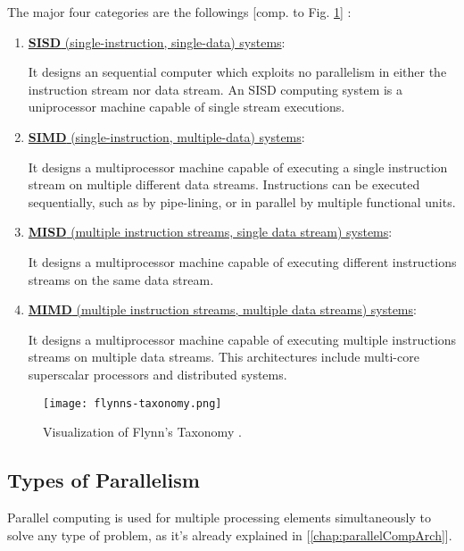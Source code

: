 \noindent The major four categories are the followings [comp. to Fig. \ref{fig:flynnsTax}] \parencite{book1}:
\begin{enumerate}
	\item \underline{\textbf{SISD} (single-instruction, single-data) systems}:
	
		  It designs an sequential computer which exploits no parallelism in either the instruction stream nor data stream.  An SISD computing system  is a uniprocessor machine capable of single stream executions.
		  
	\item \underline{\textbf{SIMD} (single-instruction, multiple-data) systems}:
	
		  It designs a multiprocessor machine capable of executing a single instruction stream on multiple different data streams. Instructions can be executed sequentially, such as by pipe-lining,  or in parallel by multiple functional units.
		  
	\item \underline{\textbf{MISD} (multiple instruction streams, single data stream) systems}:
	
		  It designs a multiprocessor machine capable of executing different instructions streams on the same data stream.
	
	\item \underline{\textbf{MIMD} (multiple instruction streams, multiple data streams)  systems}:
	
		  It designs a multiprocessor machine capable of executing multiple instructions streams on multiple data streams. This architectures include multi-core superscalar processors and distributed systems. 	  
\end{enumerate}

\begin{figure}[h!]
	\centering
	\texttt{[image: flynns-taxonomy.png]}
	\caption{
		Visualization of Flynn's Taxonomy \parencite[see][p5]{internet1}.
	}
	\label{fig:flynnsTax}
\end{figure}


\newpage

\subsection{Types of Parallelism}\label{subchap:typesOfParallelism}

Parallel computing is used for multiple processing elements simultaneously to solve any type of problem, as it's already explained in [\ref{chap:parallelCompArch}].

